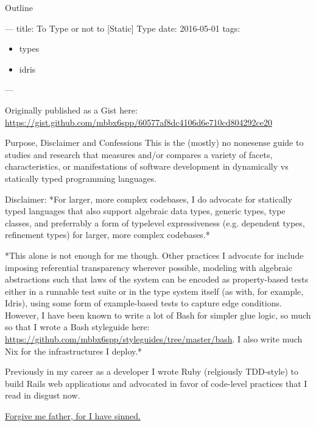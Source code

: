 \documentclass[presentation]{beamer}
\author{Susan Potter}
\date{\today}
\title{}
\begin{document}
\begin{frame}{Outline}
\tableofcontents
\end{frame}

---
title: To Type or not to [Static] Type
date: 2016-05-01
tags:
\begin{itemize}
\item types
\item idris
\end{itemize}
---

Originally published as a Gist here: \url{https://gist.github.com/mbbx6spp/60577af8dc4106d6e710cd804292ce20}

\begin{frame}[label={sec:org29a9888}]{Purpose, Disclaimer and Confessions}
This is the (mostly) no nonesense guide to studies and research that
measures and/or compares a variety of facets, characteristics, or
manifestations of software development in dynamically vs statically
typed programming languages.

\alert{\alert{Disclaimer:}} *For larger, more complex codebases, I do advocate for
statically typed languages that also support algebraic data types,
generic types, type classes, and preferrably a form of typelevel
expressiveness (e.g. dependent types, refinement types) for larger,
more complex codebases.*

*This alone is not enough for me though. Other practices I advocate
for include imposing referential transparency wherever  possible,
modeling with algebraic abstractions such that laws of the system can
be encoded as property-based tests either in a runnable test suite or
in the type system itself (as with, for example, Idris), using some
form of example-based tests to capture edge conditions. However, I
have been known to write a lot of Bash for simpler glue logic, so much
so that I wrote a Bash styleguide here:
\url{https://github.com/mbbx6spp/styleguides/tree/master/bash}. I also write
much Nix for the infrastructures I deploy.*

Previously in my career as a developer I wrote Ruby (relgiously
TDD-style) to build Rails web applications and advocated in favor of
code-level practices that I read in disgust now.

\alert{\href{http://susanpotter.net/blogs/software/2006/07/rubyisms-forwardables/}{Forgive me father, for I have sinned.}}
\end{frame}
\end{document}
